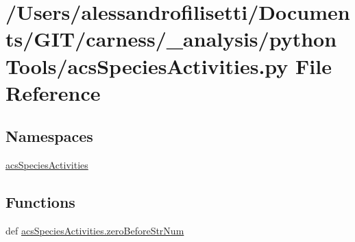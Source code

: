 \hypertarget{a00046}{\section{/\+Users/alessandrofilisetti/\+Documents/\+G\+I\+T/carness/\+\_\+analysis/python\+Tools/acs\+Species\+Activities.py File Reference}
\label{a00046}
}
\subsection*{Namespaces}
\begin{DoxyCompactItemize}
\item 
 \hyperlink{a00131}{acs\+Species\+Activities}
\end{DoxyCompactItemize}
\subsection*{Functions}
\begin{DoxyCompactItemize}
\item 
def \hyperlink{a00131_ac217c91fe2eee20671291adb12bbbbb2}{acs\+Species\+Activities.\+zero\+Before\+Str\+Num}
\end{DoxyCompactItemize}
